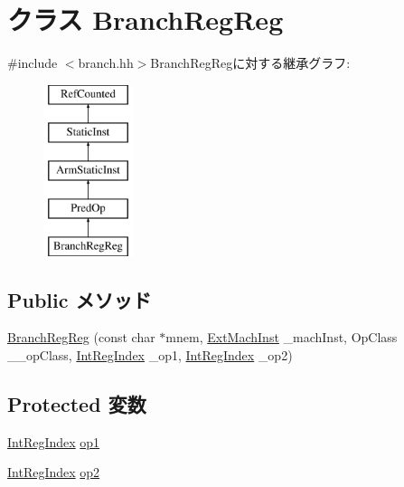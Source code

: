\hypertarget{classArmISA_1_1BranchRegReg}{
\section{クラス BranchRegReg}
\label{classArmISA_1_1BranchRegReg}
}


{\ttfamily \#include $<$branch.hh$>$}BranchRegRegに対する継承グラフ:\begin{figure}[H]
\begin{center}
\leavevmode
\includegraphics[height=5cm]{classArmISA_1_1BranchRegReg}
\end{center}
\end{figure}
\subsection*{Public メソッド}
\begin{DoxyCompactItemize}
\item 
\hyperlink{classArmISA_1_1BranchRegReg_a1b72071a9ccaa75f9a47c3c7676604f1}{BranchRegReg} (const char $\ast$mnem, \hyperlink{classStaticInst_a5605d4fc727eae9e595325c90c0ec108}{ExtMachInst} \_\-machInst, OpClass \_\-\_\-opClass, \hyperlink{namespaceArmISA_ae64680ba9fb526106829d6bf92fc791b}{IntRegIndex} \_\-op1, \hyperlink{namespaceArmISA_ae64680ba9fb526106829d6bf92fc791b}{IntRegIndex} \_\-op2)
\end{DoxyCompactItemize}
\subsection*{Protected 変数}
\begin{DoxyCompactItemize}
\item 
\hyperlink{namespaceArmISA_ae64680ba9fb526106829d6bf92fc791b}{IntRegIndex} \hyperlink{classArmISA_1_1BranchRegReg_a4c465c43ad568f8bcf8ae71480e9cfea}{op1}
\item 
\hyperlink{namespaceArmISA_ae64680ba9fb526106829d6bf92fc791b}{IntRegIndex} \hyperlink{classArmISA_1_1BranchRegReg_a7799ff6cbe5a252199059eb8665820e7}{op2}
\end{DoxyCompactItemize}


